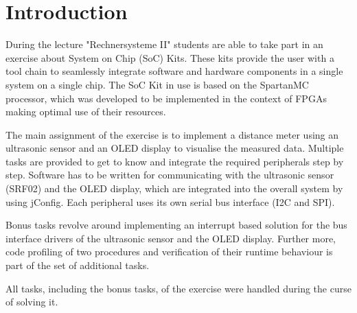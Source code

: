 \chapter{Introduction}
\label{cha:intro}
	During the lecture "Rechnersysteme II" students are able to take part in an exercise about System on Chip (SoC) Kits. These kits provide the user with a tool chain to seamlessly integrate software and hardware components in a single system on a single chip. The SoC Kit in use is based on the SpartanMC processor, which was developed to be implemented in the context of FPGAs making optimal use of their resources.

	The main assignment of the exercise is to implement a distance meter using an ultrasonic sensor and an OLED display to visualise the measured data. Multiple tasks are provided to get to know and integrate the required peripherals step by step. Software has to be written for communicating with the ultrasonic sensor (SRF02) and the OLED display, which are integrated into the overall system by using jConfig. Each peripheral uses its own serial bus interface (I2C and SPI).

	Bonus tasks revolve around implementing an interrupt based solution for the bus interface drivers of the ultrasonic sensor and the OLED display. Further more, code profiling of two procedures and verification of their runtime behaviour is part of the set of additional tasks.

	All tasks, including the bonus tasks, of the exercise were handled during the curse of solving it.